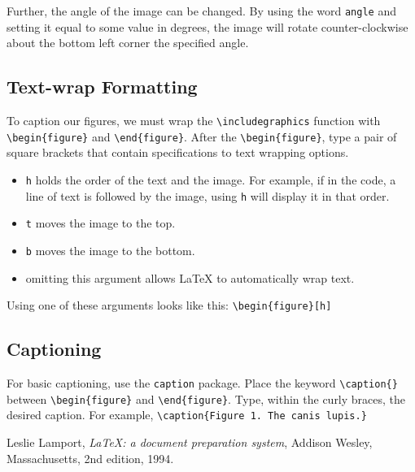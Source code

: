 \documentclass[11pt]{article}
\begin{document}
Further, the angle of the image can be changed. By using the word \texttt{angle} and setting it equal to some value in degrees, the image will rotate counter-clockwise about the bottom left corner the specified angle. 

\subsection{Text-wrap Formatting}
	To caption our figures, we must wrap the \texttt{\textbackslash includegraphics} function with \texttt{\textbackslash begin\{figure\}} and \texttt{\textbackslash end\{figure\}}. After the \texttt{\textbackslash begin\{figure\}}, type a pair of square brackets that contain specifications to text wrapping options. 

\begin{itemize}
	\item \texttt{h} holds the order of the text and the image. For example, if in the code, a line of text is followed by the image, using \texttt{h} will display it in that order. 
	\item \texttt{t} moves the image to the top.
	\item \texttt{b} moves the image to the bottom. 
	\item omitting this argument allows LaTeX to automatically wrap text.
\end{itemize}

Using one of these arguments looks like this: \texttt{\textbackslash begin\{figure\}[h]}

\subsection{Captioning}
For basic captioning, use the \texttt{caption} package. Place the keyword \texttt{\textbackslash caption\{\}} between \texttt{\textbackslash begin\{figure\}} and \texttt{\textbackslash end\{figure\}}. Type, within the curly braces, the desired caption. For example, \texttt{\textbackslash caption\{Figure 1. The canis lupis.\}}

\begin{thebibliography}{1}

  Leslie Lamport,
  \emph{\LaTeX: a document preparation system},
  Addison Wesley, Massachusetts,
  2nd edition,
  1994.

\end{thebibliography}

\end{document}
